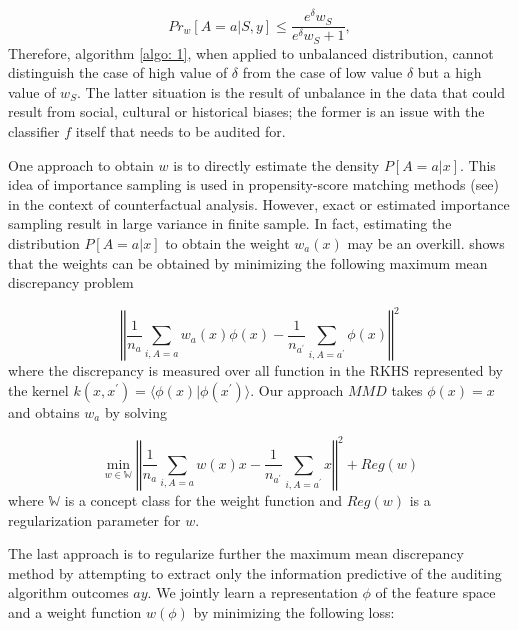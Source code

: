 \documentclass{article}
\begin{document}
\begin{equation}
    \label{eq: mdf_nw}
    Pr_{w}[A=a |S, y] \leq \frac{e^{\delta}w_{S}}{e^{\delta} w_{S} + 1},
\end{equation}
Therefore, algorithm \ref{algo: 1}, when applied to unbalanced distribution, cannot distinguish the case of high value of $\delta$ from the case of low value $\delta$ but a high value of $w_{S}$. The latter situation is the result of unbalance in the data that could result from social, cultural or historical biases; the former is an issue with the classifier $f$ itself that needs to be audited for. 

\bigskip
One approach to obtain $w$ is to directly estimate the density $P[A=a|x]$. This idea of importance sampling is used in propensity-score matching methods (see) in the context of counterfactual analysis. However, exact or estimated importance sampling result in large variance in finite sample. In fact, estimating the distribution $P[A=a|x]$ to obtain the weight $w_{a}(x)$ may be an overkill. \cite{gretton2009covariate} shows that the weights can be obtained by minimizing the following maximum mean discrepancy problem

\begin{equation}
\label{eq: mmd1}
\left \Vert \frac{1}{n_{a}}\displaystyle\sum_{i, A=a}w_{a}(x)\phi(x) -\frac{1}{n_{a^{'}}}\displaystyle\sum_{i, A=a^{'}}\phi(x)\right \Vert^{2}
\end{equation}
where the discrepancy is measured over all function in the RKHS represented by the kernel $k(x,x^{'})=\langle \phi(x)| \phi(x^{'})\rangle$. Our approach $MMD$ takes $\phi(x)=x$ and obtains $w_{a}$ by solving 

\begin{equation}
\min_{w\in \mathbb{W}}\left \Vert \frac{1}{n_{a}}\displaystyle\sum_{i, A=a}w(x)x -\frac{1}{n_{a^{'}}}\displaystyle\sum_{i, A=a^{'}}x\right \Vert^{2} + Reg(w)
\end{equation}
where $\mathbb{W}$ is a concept class for the weight function and $Reg(w)$ is a regularization parameter for $w$. 
 

\bigskip
 The last approach is to regularize further the maximum mean discrepancy method  by attempting to extract only the information predictive of the auditing algorithm outcomes $ay$. We jointly learn a representation $\phi$ of the feature space and a weight function $w(\phi)$ by minimizing the following loss:
 
\end{document}
